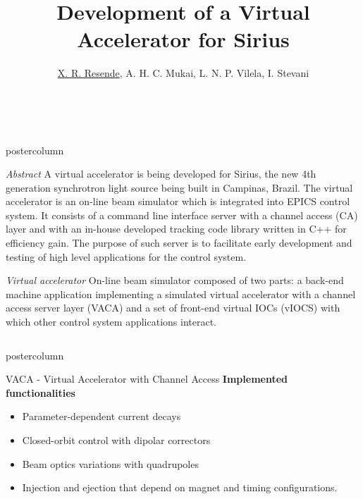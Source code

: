 \documentclass[20pt]{beamer}
\title{\huge Development of a Virtual Accelerator for Sirius}
\author{\underline{X. R. Resende}, A. H. C. Mukai, L. N. P. Vilela, I. Stevani}
\institute{Brazilian Synchrotron Light Laboratory (LNLS), Campinas, Brazil}
\date{\monthname \ \the\year}
\newlength{\abstractheight}
\newlength{\vaheight}
\newlength{\columnheight}
\begin{document}
\begin{frame}
\begin{beamercolorbox}[center]{postercolumn}
	\begin{minipage}{\textwidth}
		\parbox[t][\abstractheight]{\textwidth}{
		\begin{myblock}{\textit{Abstract}}
		A virtual accelerator is being developed for Sirius, the new 4th generation synchrotron light source being built in Campinas, Brazil.
		The virtual accelerator is an on-line beam simulator which is integrated into EPICS control system.
		It consists of a command line interface server with a channel access (CA) layer and with an in-house developed tracking code library written in C++ for efficiency gain.
		The purpose of such server is to facilitate early development and testing of high level applications for the control system.
		\end{myblock}
	}\end{minipage}
	\begin{minipage}{\textwidth}
		\parbox[t][\vaheight]{\textwidth}{
		\begin{myblock}{\textit{Virtual accelerator}}
		On-line beam simulator composed of two parts: a back-end machine
		application implementing a simulated virtual accelerator with a channel access server layer (VACA) and a set of
		front-end virtual IOCs (vIOCS) with which other control system applications interact.
		\end{myblock}
	}\end{minipage}	
\end{beamercolorbox}
\begin{columns}
	\begin{column}{0.55\textwidth}
		\begin{beamercolorbox}[center]{postercolumn}
			\begin{minipage}{.98\textwidth}  %
				\parbox[t][\columnheight]{\textwidth}{ %
					\vspace{1cm}
					\begin{myblock}{VACA - Virtual Accelerator with Channel Access}
						\textbf{Implemented functionalities}
						\begin{itemize}
							\item Parameter-dependent current decays
							\item Closed-orbit control with dipolar correctors
							\item Beam optics variations with quadrupoles
							\item Injection and ejection that depend on magnet and timing configurations.
						\end{itemize}
						\vspace{0.5cm}
						

\end{myblock}}
\end{minipage}
\end{beamercolorbox}
\end{column}
\end{columns}
\end{frame}
\end{document}
